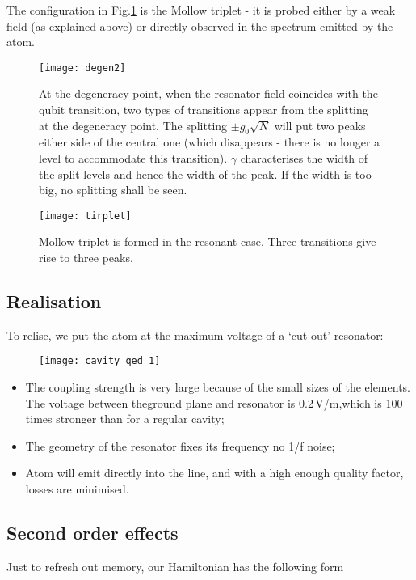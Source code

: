 The configuration  in Fig.\ref{qrDegen2} is  the Mollow triplet -  it is
probed either by a weak field  (as explained above) or directly observed
in the spectrum emitted by the atom.


\begin{figure}
  \texttt{[image: degen2]}
  \caption{At the  degeneracy point, when the  resonator field coincides
    with the qubit transition, two  types of transitions appear from the
    splitting    at    the     degeneracy    point.     The    splitting
    $ \pm  g_0\sqrt{N} $ will put  two peaks either side  of the central
    one (which  disappears - there is  no longer a level  to accommodate
    this transition).  $ \gamma $ characterises the width of the split levels
    and  hence the  width of  the peak.   If the  width is  too big,  no
    splitting shall be seen.\label{qrDegen2}}
\end{figure}

\begin{figure}
  \texttt{[image: tirplet]}
  \caption{Mollow  triplet  is  formed  in  the  resonant  case.   Three
    transitions give rise to three peaks.\label{qrMollow}}
\end{figure}
\newpage
\subsection{Realisation}
To  relise, we  put the  atom  at the  maximum  voltage of  a `cut  out'
resonator:

\begin{figure}[h]
  \centering \texttt{[image: cavity\_qed\_1]}
\end{figure}

\noindent
\begin{itemize}
\item The coupling strength is very  large because of the small sizes of
  the elements.   The voltage between  theground plane and  resonator is
  0.2\,V/m,which is 100 times stronger than for a regular cavity;
\item The  geometry of  the resonator  fixes its  frequency \ira  no 1/f
  noise;
\item Atom  will emit  directly into  the line, and  with a  high enough
  quality factor, losses are minimised.
\end{itemize}

\subsection{Second order effects}
Just to refresh out memory, our Hamiltonian has the following form

